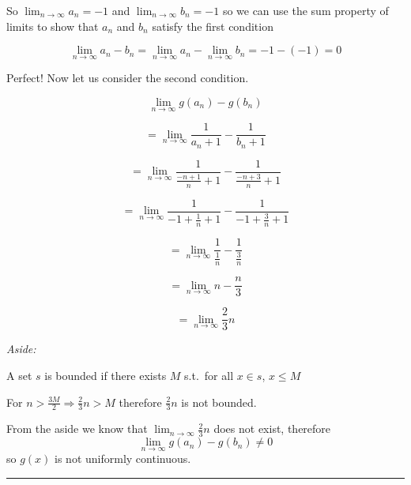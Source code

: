 \documentclass[10pt,letterpaper]{article}
\newcommand\ds{\displaystyle}
\newcommand\qedsym{\hfill \rule{2mm}{2mm}}
\begin{document}
So $\lim_{n\to\infty}a_n = -1$ and $\lim_{n\to\infty}b_n=-1$ so we can use the sum property of limits to show that $a_n$ and $b_n$ satisfy the first condition

\[\ds\lim_{n\to\infty}a_n-b_n = \lim_{n\to\infty}a_n - \lim_{n\to\infty}b_n = -1-(-1) = 0\]

Perfect! Now let us consider the second condition.

\[\ds\lim_{n\to\infty}g(a_n)-g(b_n)\]

\[=\ds\lim_{n\to\infty}\frac{1}{a_n+1}-\frac{1}{b_n+1}\]

\[=\ds\lim_{n\to\infty}\frac{1}{\frac{-n+1}{n}+1}-\frac{1}{\frac{-n+3}{n}+1}\]

\[=\ds\lim_{n\to\infty}\frac{1}{-1+\frac{1}{n}+1}-\frac{1}{-1 + \frac{3}{n}+1}\]

\[=\ds\lim_{n\to\infty}\frac{1}{\frac{1}{n}}-\frac{1}{\frac{3}{n}}\]

\[=\lim_{n\to\infty}n-\frac{n}{3}\]

\[=\lim_{n\to\infty}\frac{2}{3}n\]

{\addtolength{\leftskip}{5mm}
\textit{Aside:}

A set $s$ is bounded if there exists $M$ s.t.\ for all $x\in s$, $x\leq M$

For $\ds n>\frac{3M}{2} \Rightarrow \frac{2}{3}n > M$ therefore $\frac{2}{3}n$ is not bounded.

}

From the aside we know that $\ds\lim_{n\to\infty}\frac{2}{3}n$ does not exist, therefore \[\ds\lim_{n\to\infty}g(a_n)-g(b_n) \neq 0\] so $g(x)$ is not uniformly continuous.

\qedsym
\end{document}
